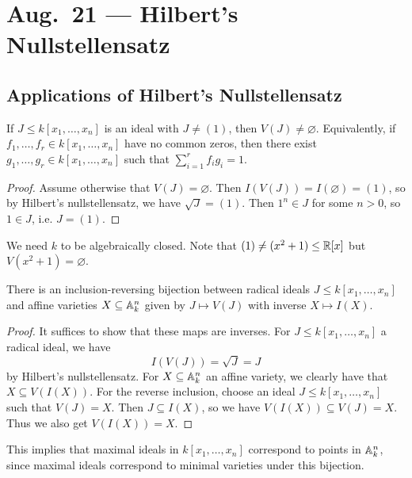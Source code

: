 \chapter{Aug.~21 --- Hilbert's Nullstellensatz}

\section{Applications of Hilbert's Nullstellensatz}

\begin{corollary}
  If $J \le k[x_1, \dots, x_n]$ is an
  ideal with $J \ne (1)$, then
  $V(J) \ne \varnothing$. Equivalently,
  if $f_1, \dots, f_r \in k[x_1, \dots, x_n]$
  have no common zeros, then there
  exist $g_1, \dots, g_r \in k[x_1, \dots, x_n]$
  such that $\sum_{i = 1}^r f_i g_i = 1$.
\end{corollary}

\begin{proof}
  Assume otherwise that $V(J) = \varnothing$.
  Then
  $I(V(J)) = I(\varnothing) = (1)$,
  so by Hilbert's nullstellensatz,
  we have $\sqrt{J} = (1)$. Then
  $1^n \in J$ for some $n > 0$, so
  $1 \in J$, i.e. $J = (1)$.
\end{proof}

\begin{remark}
  We need
  $k$ to be algebraically closed.
  Note that $(1) \ne (x^2 + 1) \le \mathbb{R}[x]$
  but $V(x^2 + 1) = \varnothing$.
\end{remark}

\begin{corollary}
  There is an inclusion-reversing bijection
  between radical ideals $J \le k[x_1, \dots, x_n]$ and
  affine varieties $X \subseteq \mathbb{A}_k^n$
  given by $J \mapsto V(J)$ with inverse $X \mapsto I(X)$.
\end{corollary}

\begin{proof}
  It suffices to show that these maps
  are inverses. For $J \le k[x_1, \dots, x_n]$
  a radical ideal, we have
  \[
    I(V(J)) = \sqrt{J} = J
  \]
  by Hilbert's nullstellensatz. For
  $X \subseteq \mathbb{A}_k^n$ an affine
  variety, we clearly have that
  $X \subseteq V(I(X))$. For the
  reverse inclusion, choose
  an ideal $J \le k[x_1, \dots, x_n]$
  such that $V(J) = X$. Then
  $J \subseteq I(X)$, so we have
  $V(I(X)) \subseteq V(J) = X$.
  Thus we also get $V(I(X)) = X$.
\end{proof}

\begin{remark}
  This implies that maximal ideals in
  $k[x_1, \dots, x_n]$ correspond to
  points in $\mathbb{A}_k^n$, since
  maximal ideals correspond to minimal
  varieties under this bijection.
\end{remark}

